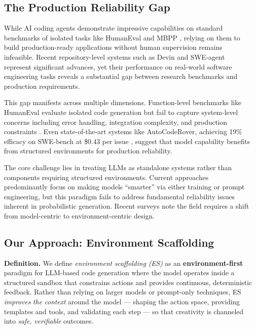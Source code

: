 \documentclass[conference]{IEEEtran}
\begin{document}
\subsection{The Production Reliability Gap}

While AI coding agents demonstrate impressive capabilities on standard benchmarks of isolated tasks like HumanEval \cite{chen2021evaluating} and MBPP \cite{austin2021program}, relying on them to build production-ready applications without human supervision remains infeasible. Recent repository-level systems such as Devin \cite{cognition2024swe} and SWE-agent \cite{yang2024swe} represent significant advances, yet their performance on real-world software engineering tasks reveals a substantial gap between research benchmarks and production requirements.

This gap manifests across multiple dimensions. Function-level benchmarks like HumanEval evaluate isolated code generation but fail to capture system-level concerns including error handling, integration complexity, and production constraints \cite{liu2023your}. Even state-of-the-art systems like AutoCodeRover, achieving 19\% efficacy on SWE-bench at \$0.43 per issue \cite{zhang2024autocoder}, suggest that model capability benefits from structured environments for production reliability.

The core challenge lies in treating LLMs as standalone systems rather than components requiring structured environments. Current approaches predominantly focus on making models ``smarter'' via either training or prompt engineering, but this paradigm fails to address fundamental reliability issues inherent in probabilistic generation. Recent surveys \cite{jiang2024survey,paul2024benchmarks} note the field requires a shift from model-centric to environment-centric design.

\subsection{Our Approach: Environment Scaffolding}

\textbf{Definition.} We define \emph{environment scaffolding (ES)} as an \textbf{environment-first} paradigm for LLM-based code generation where the model operates inside a structured sandbox that constrains actions and provides continuous, deterministic feedback. Rather than relying on larger models or prompt-only techniques, ES \emph{improves the context} around the model --- shaping the action space, providing templates and tools, and validating each step --- so that creativity is channeled into \emph{safe, verifiable} outcomes.
\end{document}
